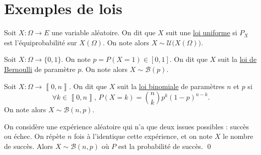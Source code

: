 \part{Exemples de lois}

\begin{defn}
	Soit $X : \Omega \to  E$ une variable aléatoire. On dit que $X$ suit une \underline{loi uniforme} si $P_X$ est l'équiprobabilité sur $X(\Omega)$.
	On note alors $X \sim \mathcal{U}\!\big(X(\Omega)\big)$.
\end{defn}

\begin{defn}
	Soit $X : \Omega \to \{0,1\}$. On note $p = P(X = 1) \in [0,1]$. On dit que $X$ suit la \underline{loi de Bernoulli} de paramètre $p$. On note alors $X \sim \mathcal{B}(p)$.
\end{defn}

\begin{defn}
	Soit $X : \Omega \to \left\llbracket 0,n \right\rrbracket$. On dit que $X$ suit la \underline{loi binomiale} de paramètres $n$ et $p$ si \[
		\forall k \in \left\llbracket 0,n \right\rrbracket,\,P(X = k) = {n\choose k} p^k (1-p)^{n-k}
	.\] On note alors $X \sim \mathcal{B}(n,p)$.
\end{defn}

\begin{thm}
	On considère une expérience aléatoire qui n'a que deux issues possibles : succès ou échec. On répète $n$ fois à l'identique cette expérience, et on note $X$ le nombre de succès. Alors $X \sim \mathcal{B}(n,p)$ où $P$ est la probabilité de succès.
	\qed
\end{thm}


